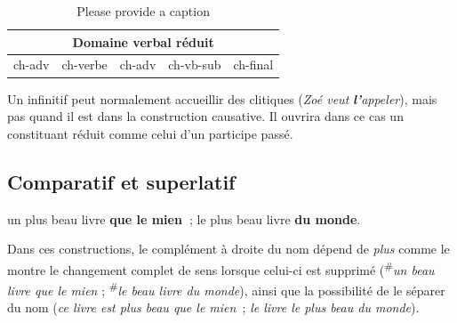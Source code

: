 \begin{table}
\caption{\label{tab:}{\color{red}Please provide a caption}}
\def\arraystretch{1.5}
\setlength{\tabcolsep}{3ex}
\begin{tabular}{|c|c|c|c|c|}
\hline
\multicolumn{5}{|c|}{\cellcolor{lsDOIGray}Domaine verbal réduit}\\
\hline
ch-adv & \cellcolor{lsDOIGray}ch-verbe & ch-adv & ch-vb-sub & ch-final\\
\hline
\end{tabular}
\end{table}

Un infinitif peut normalement accueillir des clitiques (\textit{Zoé veut} \textbf{\textit{l’}}\textit{appeler}), mais pas quand il est dans la construction causative. Il ouvrira dans ce cas un constituant réduit comme celui d’un participe passé.

\subsection{Comparatif et superlatif}

\ea
\ea
{un plus beau livre} \textbf{{que le mien~}};
\ex
 {le plus beau livre} \textbf{{du monde}}.
\z
\z

Dans ces constructions, le complément à droite du nom dépend de \textit{plus} comme le montre le changement complet de sens lorsque celui-ci est supprimé (\textsuperscript{\#}\textit{un beau livre que le mien} ; \textsuperscript{\#}\textit{le beau livre du monde}), ainsi que la possibilité de le séparer du nom (\textit{ce livre est plus beau que le mien~}; \textit{le livre le plus beau du monde}).

\begin{figure}
\caption{\label{fig:}}
\end{figure}

